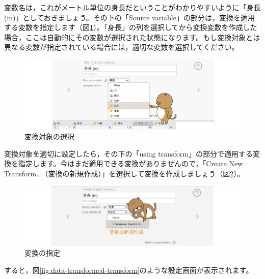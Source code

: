 \documentclass[
  12pt,
  a5jpaper,
  lualatex, ja=standard]{bxjsbook}
\begin{document}
変数名は，これがメートル単位の身長だということがわかりやすいように「身長 (m)」としておきましょう。その下の「Source variable」の部分は，変換を適用する変数を指定します（図\ref{fig:data-transformed-source-select}）。「身長」の列を選択してから変換変数を作成した場合，ここは自動的にその変数が選択された状態になります。もし変換対象とは異なる変数が指定されている場合には，適切な変数を選択してください。

\begin{figure}[!ht]

{\centering \includegraphics[width=1\linewidth]{images/basics/data-transformed-source-select} 

}

\caption{変換対象の選択}\label{fig:data-transformed-source-select}
\end{figure}

変換対象を適切に設定したら，その下の「using transform」の部分で適用する変換を指定します。今はまだ適用できる変換がありませんので，「Create New Transform\ldots（変換の新規作成）」を選択して変換を作成しましょう（図\ref{fig:data-transformed-transform-select}）。

\begin{figure}[!ht]

{\centering \includegraphics[width=1\linewidth]{images/basics/data-transformed-transform-select} 

}

\caption{変換の指定}\label{fig:data-transformed-transform-select}
\end{figure}

すると，図\ref{fig:data-transformed-transform}のような設定画面が表示されます。
\end{document}
